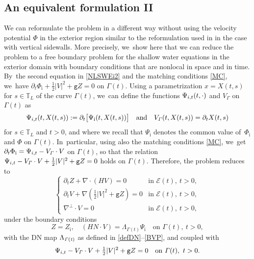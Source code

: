 \documentclass[11pt]{article}
\newcommand{\gr}{{\mathtt g}}
\newcommand{\dt}{\partial_t}
\newcommand{\cE}{{\mathcal E}}
\newcommand{\itGamma}{\mathit{\Gamma}}
\theoremstyle{definition}
\begin{document}
\subsection{An equivalent formulation II}\label{subsect:EF2}
We can reformulate the problem in a different way without using the velocity potential $\Phi$ in the exterior region similar to the reformulation used in
\cite[Section 5.1]{IguchiLannes2023} in the case with vertical sidewalls.
More precisely, we~show here that we can reduce the problem to a free boundary problem for the shallow water equations in the exterior domain
with boundary conditions that are nonlocal in space and in time. By~the second equation in \eqref{NLSWEi2} and the matching conditions \eqref{MC}, we~have $\dt\Phi_\mathrm{i}+\frac12|V|^2+\gr Z=0$ on $\itGamma(t)$.
Using a parametrization $x=X(t,s)$ for $s\in {\mathbb T}_L$ of the curve $\itGamma(t)$, we~can define the functions $\Psi_{{\rm i},t}(t,\cdot)$ and $V_{\itGamma}$ on $\itGamma(t)$ as
\[
\Psi_{{\rm i},t}(t,X(t,s)):=\partial_t \bigl[ \Psi_\mathrm{i}(t,X(t,s))\bigr] \quad\mbox{and}\quad V_\itGamma(t,X(t,s))=\dt X(t,s)
\]
for $s\in {\mathbb T}_L$ and $t>0$, and where we recall that $\Psi_\mathrm{i}$ denotes the common value of~$\Phi_\mathrm{i}$ and $\Phi$ on $\itGamma(t)$. In~particular, using also the matching conditions \eqref{MC}, we~get $\dt \Phi_\mathrm{i}=\Psi_{{\rm i},t} - V_\itGamma\cdot V$ on $\itGamma(t)$,
so that the relation $\Psi_{{\rm i},t} - V_\itGamma\cdot V+\tfrac12|V|^2+\gr Z=0$ holds on $\itGamma(t)$.
Therefore, the problem reduces to
\begin{equation}\label{NLSWEe4}
\begin{cases}
\dt Z+\nabla\cdot(HV) = 0 &\text{in } \cE(t), \ t>0, \\
\dt V+\nabla(\frac12|V|^2+\gr Z) = 0 &\text{in } \cE(t), \ t>0, \\
\nabla^\perp\cdot V = 0 &\text{in } \cE(t), \ t>0,
\end{cases}
\end{equation}
under the boundary conditions
\begin{equation}\label{BC4}
Z=Z_\mathrm{i}, \quad (HN\cdot V) = \Lambda_{\itGamma(t)}\Psi_\mathrm{i} \quad\text{on } \itGamma(t), \ t>0,
\end{equation}
with the DN map $\Lambda_{\it\Gamma(t)}$ as defined in \eqref{defDN}--\eqref{BVP}, and coupled with
\begin{equation}\label{ODE}
\Psi_{{\rm i},t} - V_\itGamma\cdot V+\tfrac12 |V|^2+\gr Z=0 \quad\text{on } \itGamma(t), \ t>0.
\end{equation}
\end{document}
